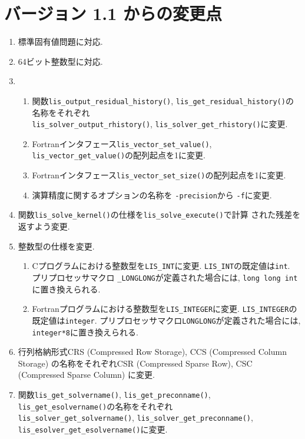 \documentclass[a4paper]{jarticle}
\begin{document}
\section*{バージョン 1.1 からの変更点}
\begin{enumerate}
\item 標準固有値問題に対応.
\item 64ビット整数型に対応.
\item 
\begin{enumerate}
\item 関数{\tt lis\_output\_residual\_history()}, 
      {\tt lis\_get\_residual\_history()}の名称をそれぞれ\\
      {\tt lis\_solver\_output\_rhistory()}, {\tt lis\_solver\_get\_rhistory()}に変更.
\item Fortranインタフェース{\tt lis\_vector\_set\_value()},
      {\tt lis\_vector\_get\_value()}の配列起点を1に変更.
\item Fortranインタフェース{\tt lis\_vector\_set\_size()}の配列起点を1に変更.
\item 演算精度に関するオプションの名称を {\tt -precision}から {\tt -f}に変更.
\end{enumerate}
\item 関数{\tt lis\_solve\_kernel()}の仕様を{\tt lis\_solve\_execute()}で計算
      された残差を返すよう変更. 
\item 整数型の仕様を変更. 
\begin{enumerate}
\item Cプログラムにおける整数型を{\tt LIS\_INT}に変更. 
      {\tt LIS\_INT}の既定値は{\tt int}. プリプロセッサマクロ
      {\tt \_LONGLONG}が定義された場合には, {\tt long long int}に置き換えられる. 
\item Fortranプログラムにおける整数型を{\tt LIS\_INTEGER}に変更. 
      {\tt LIS\_INTEGER}の既定値は{\tt integer}. 
      プリプロセッサマクロ{\tt LONGLONG}が定義された場合には, 
      {\tt integer*8}に置き換えられる. 
\end{enumerate}
\item 行列格納形式CRS (Compressed Row Storage), CCS (Compressed Column Storage)
      の名称をそれぞれCSR (Compressed Sparse Row), CSC (Compressed Sparse Column)
      に変更. 
\item 関数{\tt lis\_get\_solvername()}, {\tt lis\_get\_preconname()}, 
      {\tt lis\_get\_esolvername()}の名称をそれぞれ\\
      {\tt lis\_solver\_get\_solvername()}, 
      {\tt lis\_solver\_get\_preconname()}, 
{\tt lis\_esolver\_get\_esolvername()}に変更.
\end{enumerate}
\end{document}
